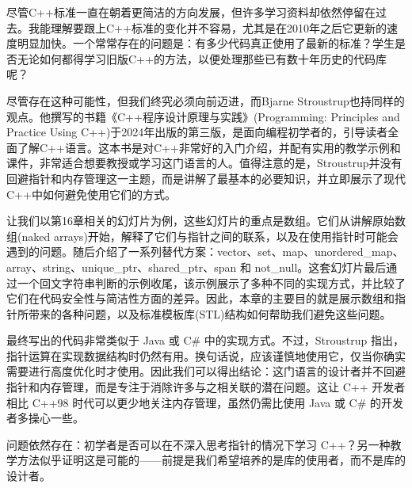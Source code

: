 尽管C++标准一直在朝着更简洁的方向发展，但许多学习资料却依然停留在过去。我能理解要跟上C++标准的变化并不容易，尤其是在2010年之后它更新的速度明显加快。一个常常存在的问题是：有多少代码真正使用了最新的标准？学生是否无论如何都得学习旧版C++的方法，以便处理那些已有数十年历史的代码库呢？

尽管存在这种可能性，但我们终究必须向前迈进，而Bjarne Stroustrup也持同样的观点。他撰写的书籍《C++程序设计原理与实践》(Programming: Principles and Practice Using C++)于2024年出版的第三版，是面向编程初学者的，引导读者全面了解C++语言。这本书是对C++非常好的入门介绍，并配有实用的教学示例和课件，非常适合想要教授或学习这门语言的人。值得注意的是，Stroustrup并没有回避指针和内存管理这一主题，而是讲解了最基本的必要知识，并立即展示了现代C++中如何避免使用它们的方式。

让我们以第16章相关的幻灯片为例，这些幻灯片的重点是数组。它们从讲解原始数组(naked arrays)开始，解释了它们与指针之间的联系，以及在使用指针时可能会遇到的问题。随后介绍了一系列替代方案：vector、set、map、unordered\_map、array、string、unique\_ptr、shared\_ptr、span 和 not\_null。这套幻灯片最后通过一个回文字符串判断的示例收尾，该示例展示了多种不同的实现方式，并比较了它们在代码安全性与简洁性方面的差异。因此，本章的主要目的就是展示数组和指针所带来的各种问题，以及标准模板库(STL)结构如何帮助我们避免这些问题。

最终写出的代码非常类似于 Java 或 C\# 中的实现方式。不过，Stroustrup 指出，指针运算在实现数据结构时仍然有用。换句话说，应该谨慎地使用它，仅当你确实需要进行高度优化时才使用。因此我们可以得出结论：这门语言的设计者并不回避指针和内存管理，而是专注于消除许多与之相关联的潜在问题。这让 C++ 开发者相比 C++98 时代可以更少地关注内存管理，虽然仍需比使用 Java 或 C\# 的开发者多操心一些。

问题依然存在：初学者是否可以在不深入思考指针的情况下学习 C++？另一种教学方法似乎证明这是可能的——前提是我们希望培养的是库的使用者，而不是库的设计者。